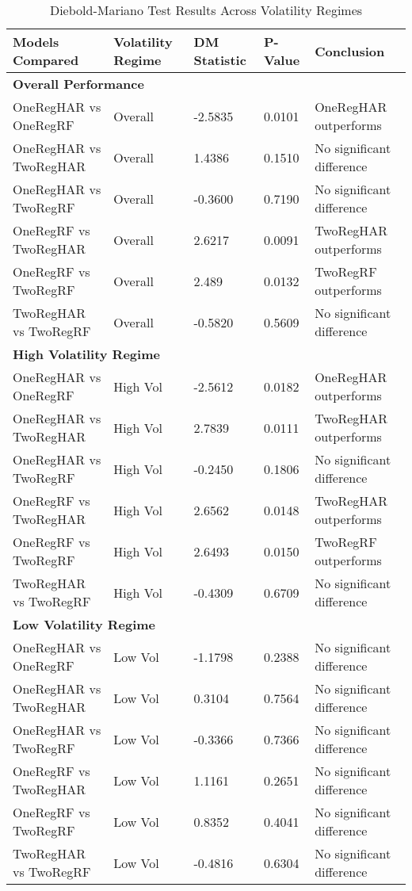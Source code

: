\documentclass{article}
\begin{document}
\begin{table}[htbp]
	\centering
	\caption{Diebold-Mariano Test Results Across Volatility Regimes}
	\label{tab:dm-test-results}
	\begin{tabular}{p{4.6cm} p{2.4cm} p{2.3cm} p{2.1cm} p{4.0cm}}
		\toprule
		\textbf{Models Compared} & \textbf{Volatility Regime} & \textbf{DM Statistic} & \textbf{P-Value} & \textbf{Conclusion} \\
		\midrule
		\multicolumn{5}{l}{\textbf{Overall Performance}} \\
		\midrule
		OneRegHAR vs OneRegRF   & Overall   & -2.5835 & 0.0101 & OneRegHAR outperforms \\
		OneRegHAR vs TwoRegHAR   & Overall   & 1.4386  & 0.1510 & No significant difference \\
		OneRegHAR vs TwoRegRF    & Overall   & -0.3600 & 0.7190 & No significant difference \\
		OneRegRF vs TwoRegHAR    & Overall   & 2.6217  & 0.0091 & TwoRegHAR outperforms \\
		OneRegRF vs TwoRegRF     & Overall   & 2.489  & 0.0132 & TwoRegRF outperforms \\
		TwoRegHAR vs TwoRegRF    & Overall   & -0.5820 & 0.5609 & No significant difference \\
		\midrule
		\multicolumn{5}{l}{\textbf{High Volatility Regime}} \\
		\midrule
		OneRegHAR vs OneRegRF   & High Vol  & -2.5612 & 0.0182 & OneRegHAR outperforms \\
		OneRegHAR vs TwoRegHAR   & High Vol  & 2.7839  & 0.0111 & TwoRegHAR outperforms \\
		OneRegHAR vs TwoRegRF    & High Vol  & -0.2450 & 0.1806 & No significant difference \\
		OneRegRF vs TwoRegHAR    & High Vol  & 2.6562  & 0.0148 & TwoRegHAR outperforms \\
		OneRegRF vs TwoRegRF     & High Vol  & 2.6493 & 0.0150 & TwoRegRF outperforms \\
		TwoRegHAR vs TwoRegRF    & High Vol  & -0.4309 & 0.6709 & No significant difference \\
		\midrule
		\multicolumn{5}{l}{\textbf{Low Volatility Regime}} \\
		\midrule
		OneRegHAR vs OneRegRF   & Low Vol   & -1.1798 & 0.2388 & No significant difference \\
		OneRegHAR vs TwoRegHAR   & Low Vol   & 0.3104  & 0.7564 & No significant difference \\
		OneRegHAR vs TwoRegRF    & Low Vol   & -0.3366 & 0.7366 & No significant difference \\
		OneRegRF vs TwoRegHAR    & Low Vol   & 1.1161  & 0.2651 & No significant difference \\
		OneRegRF vs TwoRegRF     & Low Vol   & 0.8352  & 0.4041 & No significant difference \\
		TwoRegHAR vs TwoRegRF    & Low Vol   & -0.4816 & 0.6304 & No significant difference \\
		\bottomrule
	\end{tabular}
\end{table}
	
\end{document}
